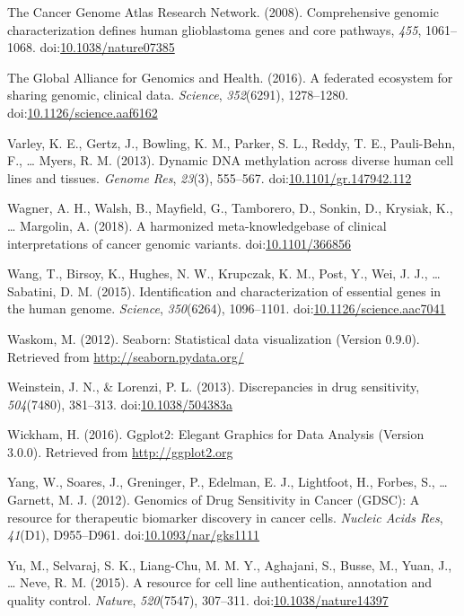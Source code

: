 \documentclass[man,floatsintext]{apa6}
\begin{document}
\hypertarget{ref-thecancergenomeatlasresearchnetwork2008}{}
The Cancer Genome Atlas Research Network. (2008). Comprehensive genomic
characterization defines human glioblastoma genes and core pathways,
\emph{455}, 1061--1068.
doi:\href{https://doi.org/10.1038/nature07385}{10.1038/nature07385}

\hypertarget{ref-theglobalallianceforgenomicsandhealth2016}{}
The Global Alliance for Genomics and Health. (2016). A federated
ecosystem for sharing genomic, clinical data. \emph{Science},
\emph{352}(6291), 1278--1280.
doi:\href{https://doi.org/10.1126/science.aaf6162}{10.1126/science.aaf6162}

\hypertarget{ref-varley2013}{}
Varley, K. E., Gertz, J., Bowling, K. M., Parker, S. L., Reddy, T. E.,
Pauli-Behn, F., \ldots{} Myers, R. M. (2013). Dynamic DNA methylation
across diverse human cell lines and tissues. \emph{Genome Res},
\emph{23}(3), 555--567.
doi:\href{https://doi.org/10.1101/gr.147942.112}{10.1101/gr.147942.112}

\hypertarget{ref-wagner2018}{}
Wagner, A. H., Walsh, B., Mayfield, G., Tamborero, D., Sonkin, D.,
Krysiak, K., \ldots{} Margolin, A. (2018). A harmonized
meta-knowledgebase of clinical interpretations of cancer genomic
variants. doi:\href{https://doi.org/10.1101/366856}{10.1101/366856}

\hypertarget{ref-wang2015a}{}
Wang, T., Birsoy, K., Hughes, N. W., Krupczak, K. M., Post, Y., Wei, J.
J., \ldots{} Sabatini, D. M. (2015). Identification and characterization
of essential genes in the human genome. \emph{Science},
\emph{350}(6264), 1096--1101.
doi:\href{https://doi.org/10.1126/science.aac7041}{10.1126/science.aac7041}

\hypertarget{ref-waskom2012}{}
Waskom, M. (2012). Seaborn: Statistical data visualization (Version
0.9.0). Retrieved from \url{http://seaborn.pydata.org/}

\hypertarget{ref-weinstein2013}{}
Weinstein, J. N., \& Lorenzi, P. L. (2013). Discrepancies in drug
sensitivity, \emph{504}(7480), 381--313.
doi:\href{https://doi.org/10.1038/504383a}{10.1038/504383a}

\hypertarget{ref-wickham2016}{}
Wickham, H. (2016). Ggplot2: Elegant Graphics for Data Analysis (Version
3.0.0). Retrieved from \url{http://ggplot2.org}

\hypertarget{ref-yang2012}{}
Yang, W., Soares, J., Greninger, P., Edelman, E. J., Lightfoot, H.,
Forbes, S., \ldots{} Garnett, M. J. (2012). Genomics of Drug Sensitivity
in Cancer (GDSC): A resource for therapeutic biomarker discovery in
cancer cells. \emph{Nucleic Acids Res}, \emph{41}(D1), D955--D961.
doi:\href{https://doi.org/10.1093/nar/gks1111}{10.1093/nar/gks1111}

\hypertarget{ref-yu2015}{}
Yu, M., Selvaraj, S. K., Liang-Chu, M. M. Y., Aghajani, S., Busse, M.,
Yuan, J., \ldots{} Neve, R. M. (2015). A resource for cell line
authentication, annotation and quality control. \emph{Nature},
\emph{520}(7547), 307--311.
doi:\href{https://doi.org/10.1038/nature14397}{10.1038/nature14397}

\endgroup
\end{document}
